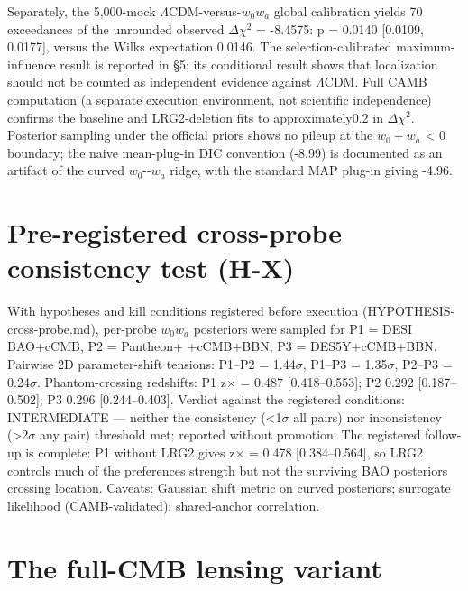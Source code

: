 \documentclass[aps,prd,preprint,superscriptaddress,nofootinbib]{revtex4-2}
\begin{document}
Separately, the 5,000-mock \(\Lambda\)CDM-versus-\(w_0\)\(w_a\) global
calibration yields 70 exceedances of the unrounded observed
\(\Delta\chi^2\) = -8.4575: p = 0.0140 {[}0.0109, 0.0177{]}, versus the
Wilks expectation 0.0146. The selection-calibrated maximum-influence
result is reported in §5; its conditional result shows that localization
should not be counted as independent evidence against \(\Lambda\)CDM.
Full CAMB computation (a separate execution environment, not scientific
independence) confirms the baseline and LRG2-deletion fits to
approximately0.2 in \(\Delta\chi^2\). Posterior sampling under the
official priors shows no pileup at the \(w_0+w_a\) \textless{} 0
boundary; the naive mean-plug-in DIC convention (-8.99) is documented as
an artifact of the curved \(w_0\)-\/-\(w_a\) ridge, with the standard
MAP plug-in giving -4.96.

\section{Pre-registered cross-probe consistency test
(H-X)}\label{pre-registered-cross-probe-consistency-test-h-x}

With hypotheses and kill conditions registered before execution
(HYPOTHESIS-cross-probe.md), per-probe \(w_0\)\(w_a\) posteriors were
sampled for P1 = DESI BAO+cCMB, P2 = Pantheon+ +cCMB+BBN, P3 =
DES5Y+cCMB+BBN. Pairwise 2D parameter-shift tensions: P1--P2 =
1.44\(\sigma\), P1--P3 = 1.35\(\sigma\), P2--P3 = 0.24\(\sigma\).
Phantom-crossing redshifts: P1 z\(\times\) = 0.487 {[}0.418--0.553{]};
P2 0.292 {[}0.187--0.502{]}; P3 0.296 {[}0.244--0.403{]}. Verdict
against the registered conditions: INTERMEDIATE --- neither the
consistency (\textless1\(\sigma\) all pairs) nor inconsistency
(\textgreater2\(\sigma\) any pair) threshold met; reported without
promotion. The registered follow-up is complete: P1 without LRG2 gives
z\(\times\) = 0.478 {[}0.384--0.564{]}, so LRG2 controls much of the
preference\textquotesingle s strength but not the surviving BAO
posterior\textquotesingle s crossing location. Caveats: Gaussian shift
metric on curved posteriors; surrogate likelihood (CAMB-validated);
shared-anchor correlation.

\section{The full-CMB lensing
variant}\label{the-full-cmb-lensing-variant}
\end{document}
